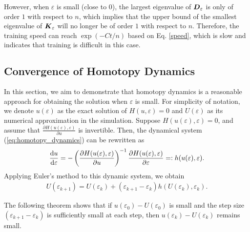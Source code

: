 \begin{remark}
However, when \( \varepsilon \) is small (close to 0), the largest eigenvalue of  
\( \boldsymbol{D}_\varepsilon \)
is only of order \( 1 \) with respect to \( n \), which implies that the upper bound of the smallest eigenvalue of \( \boldsymbol{K}_\varepsilon \) will no longer be of order \( 1 \) with respect to \( n \). Therefore, the training speed can reach \( \exp(-Ct/n) \) based on Eq. \eqref{speed}, which is slow and indicates that training is difficult in this case.
\end{remark}


\subsection{Convergence of Homotopy Dynamics}
In this section, we aim to demonstrate that homotopy dynamics is a reasonable approach for obtaining the solution when \( \varepsilon \) is small. For simplicity of notation, we denote \( u(\varepsilon) \) as the exact solution of \( H(u,\varepsilon) = 0 \) and \( U(\varepsilon) \) as its numerical approximation in the simulation. Suppose \( H(u(\varepsilon),\varepsilon) = 0 \), and assume that \( \frac{\partial H(u(\varepsilon),\varepsilon)}{\partial u} \) is invertible. Then, the dynamical system (\ref{eq:homotopy_dynamics}) can be rewritten as  
\begin{equation}
\frac{\mathrm{d} u}{\mathrm{d} \varepsilon} = -\left(\frac{\partial H(u(\varepsilon),\varepsilon)}{\partial u}\right)^{-1} \frac{\partial H(u(\varepsilon),\varepsilon)}{\partial \varepsilon} =: h(u(\varepsilon),\varepsilon).\label{dym}
\end{equation}
Applying Euler’s method to this dynamic system, we obtain  
\begin{align}
    U(\varepsilon_{k+1}) = U(\varepsilon_k) + (\varepsilon_{k+1} - \varepsilon_k) h( U(\varepsilon_k),\varepsilon_k).
\end{align} 

The following theorem shows that if \( u(\varepsilon_0)-U(\varepsilon_0) \) is small and the step size \( (\varepsilon_{k+1} - \varepsilon_k) \) is sufficiently small at each step, then \( u(\varepsilon_k)- U(\varepsilon_k) \) remains small.

